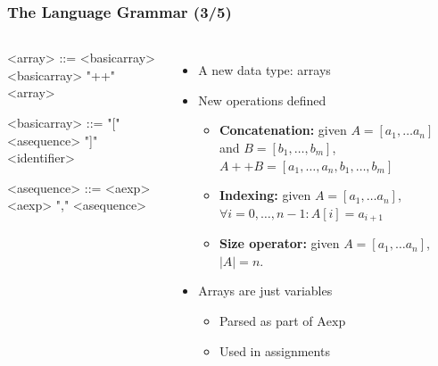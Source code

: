 \documentclass{beamer}
\begin{document}
\begin{frame}[fragile]
	\footnotesize
	\frametitle{The Language Grammar (3/5)}
	\begin{columns}
		\begin{grammar}
			<array> ::= <basicarray>
			\alt <basicarray> "++" <array>

			<basicarray> ::= "[" <asequence> "]"
			\alt <identifier>

			<asequence> ::= <aexp>
			\alt <aexp> "," <asequence>
		\end{grammar}

		\begin{itemize}
			\item A new data type: arrays
			\item New operations defined
				\begin{itemize}
					\footnotesize
					\item \textbf{Concatenation:} given $A=\left[ a_1,\ldots a_n\right]$
						and $B = \left[ b_1,\ldots, b_m\right]$,
						$A++B=\left[a_1,\ldots, a_n, b_1, \ldots, b_m\right]$
					\item \textbf{Indexing:} given $A=\left[ a_1,\ldots a_n\right]$,
						$\forall i = 0,\ldots, n-1: A[i] = a_{i+1}$
					\item \textbf{Size operator:} given $A=\left[ a_1,\ldots a_n\right]$,
						$|A|=n$.
				\end{itemize}
			\item Arrays are just variables
				\begin{itemize}
					\footnotesize
					\item Parsed as part of $\mathrm{Aexp}$
					\item Used in assignments
				\end{itemize}
		\end{itemize}
	\end{columns}
\end{frame}
\end{document}
